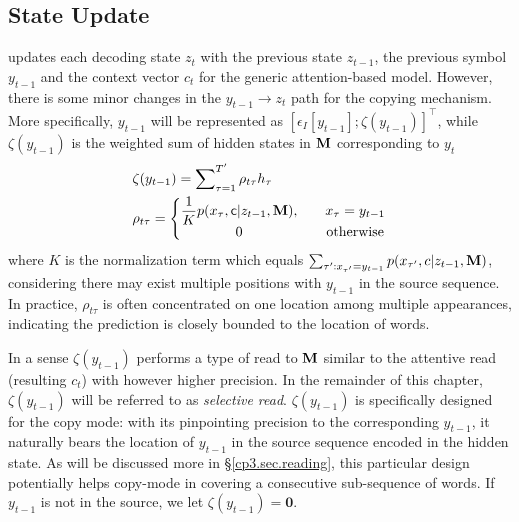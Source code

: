  \subsection{State Update}
\label{cp3.sec.stateupdate}
\copynet updates each decoding state $z_{t}$ with the previous state $z_{t-1}$, 
the previous symbol $y_{t-1}$ and the context vector $c_{t}$ 
for the generic attention-based \sts model. 
However, there is some minor changes in the 
$y_{t-1}\longrightarrow z_{t}$ path for the copying mechanism. 
More specifically, $y_{t-1}$ will be represented as $\left[\epsilon_I[y_{t-1}] ; \zeta(y_{t-1})\right]^\top$, 
while $\zeta(y_{t-1})$ is the weighted sum of hidden states in $\mathbf{M}$ corresponding to $y_t$ 
\begin{equation}
\label{cp3.eq.loc}
\begin{split}
	&\zeta(y_{t-1}) = \sum\nolimits_{\tau=1}^{T'}\rho_{t\tau} h_{\tau}\\
	&\rho_{t\tau} = \left \{ \begin{matrix} 
	     \dfrac{1}{K} p(x_\tau, \textsf{c} | z_{t-1}, \mathbf{M}),
	     \quad & x_{\tau} = y_{t-1}\\
		0 \quad & \text{otherwise} 
	\end{matrix}\right.
\end{split} 
\end{equation}
where $K$ is the normalization term 
which equals $\sum_{{\tau'}:x_{\tau'}=y_{t-1}} p(x_{\tau'}, c | z_{t-1}, \mathbf{M})$, 
considering there may exist multiple positions with $y_{t-1}$ in the source sequence. 
In practice, $\rho_{t\tau}$ is often concentrated on one location among multiple appearances, 
indicating the prediction is closely bounded to the location of words.  

In a sense $\zeta(y_{t-1})$ performs a type of read to $\mathbf{M}$ similar to 
the attentive read (resulting $c_t$) with however higher precision. 
In the remainder of this chapter, $\zeta(y_{t-1})$ will be referred to as \emph{selective read}. 
$\zeta(y_{t-1})$ is specifically designed for the copy mode: 
with its pinpointing precision to the corresponding  $y_{t-1}$, 
it naturally bears the location of $y_{t-1}$ in the source sequence encoded in the hidden state. 
As will be discussed more in \S\ref{cp3.sec.reading}, 
this particular design potentially helps copy-mode in covering a consecutive sub-sequence of words. 
If $y_{t-1}$ is not in the source,  we let $\zeta(y_{t-1})=\textbf{0}$. 



